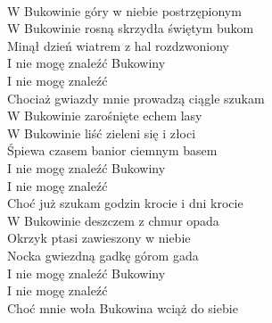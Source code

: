 
\begin{flushleft}
\tab{}\tab{}\tab{}\\
W Bukowinie góry w niebie postrzępionym \tab{} \\
W Bukowinie rosną skrzydła świętym bukom \tab{}\\
Minął dzień wiatrem z hal rozdzwoniony\tab{} \\
I nie mogę znaleźć Bukowiny \tab{}\tab{}\\
I nie mogę znaleźć \tab{}\tab{}\\
Chociaż gwiazdy mnie prowadzą ciągle szukam \\
\vskip 3mm
W Bukowinie zarośnięte echem lasy \\
W Bukowinie liść zieleni się i złoci \\
Śpiewa czasem banior ciemnym basem \\
I nie mogę znaleźć Bukowiny \\
I nie mogę znaleźć \\
Choć już szukam godzin krocie i dni krocie \\
\vskip 3mm
W Bukowinie deszczem z chmur opada \\
Okrzyk ptasi zawieszony w niebie \\
Nocka gwiezdną gadkę górom gada \\
I nie mogę znaleźć Bukowiny \\
I nie mogę znaleźć \\
Choć mnie woła Bukowina wciąż do siebie \\
\end{flushleft}
\clearpage